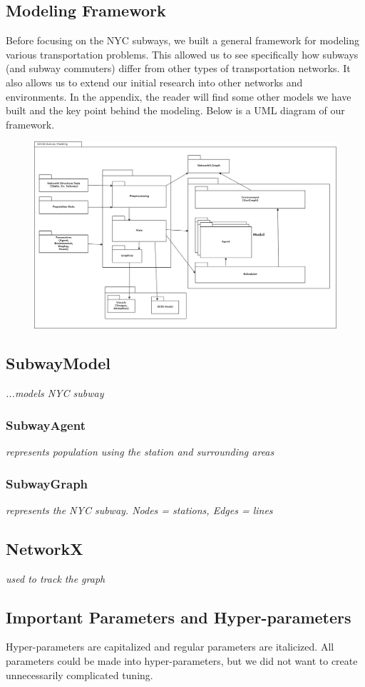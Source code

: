 \documentclass[12pt, a4, epsf] {article}
\theoremstyle{plain}
\theoremstyle{definition}
\begin{document}
\subsection{Modeling Framework}
Before focusing on the NYC subways, we built a general framework for modeling various transportation problems. This allowed us to see specifically how subways (and subway commuters) differ from other types of transportation networks. It also allows us to extend our initial research into other networks and environments. In the appendix, the reader will find some other models we have built and the key point behind the modeling. Below is a UML diagram of our framework.
\begin{figure}[htbp]
\includegraphics[width = 1.0\textwidth]{Scratch_Visuals/covid_subway.png}
\end{figure}
\subsection{SubwayModel}
\textit{...models NYC subway}
\subsubsection{SubwayAgent}
\textit{represents population using the station and surrounding areas}
\subsubsection{SubwayGraph}
\textit{represents the NYC subway. Nodes = stations, Edges = lines}
\subsection{NetworkX}
\textit{used to track the graph}
\subsection{Important Parameters and Hyper-parameters}
Hyper-parameters are capitalized and regular parameters are italicized. All parameters could be made into hyper-parameters, but we did not want to create unnecessarily complicated tuning.
\end{document}

